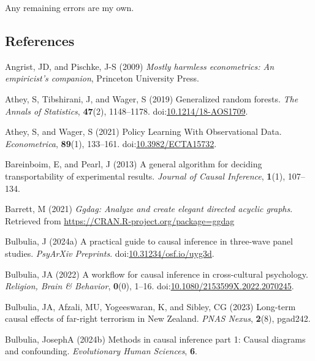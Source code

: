 \documentclass[
  single column]{article}
\newlength{\cslhangindent}
\newenvironment{CSLReferences}[2] %
 {\begin{list}{}{%
  \setlength{\itemindent}{0pt}
  \setlength{\leftmargin}{0pt}
  \setlength{\parsep}{0pt}
  \ifodd #1
   \setlength{\leftmargin}{\cslhangindent}
   \setlength{\itemindent}{-1\cslhangindent}
  \fi
  \setlength{\itemsep}{#2\baselineskip}}}
 {\end{list}}
\begin{document}
Any remaining errors are my own.

\newpage{}

\subsection{References}\label{references}

\label{refs}
\begin{CSLReferences}{1}{0}
Angrist, JD, and Pischke, J-S (2009) \emph{Mostly harmless econometrics:
An empiricist's companion}, Princeton University Press.

Athey, S, Tibshirani, J, and Wager, S (2019) Generalized random forests.
\emph{The Annals of Statistics}, \textbf{47}(2), 1148--1178.
doi:\href{https://doi.org/10.1214/18-AOS1709}{10.1214/18-AOS1709}.

Athey, S, and Wager, S (2021) Policy Learning With Observational Data.
\emph{Econometrica}, \textbf{89}(1), 133--161.
doi:\href{https://doi.org/10.3982/ECTA15732}{10.3982/ECTA15732}.

Bareinboim, E, and Pearl, J (2013) A general algorithm for deciding
transportability of experimental results. \emph{Journal of Causal
Inference}, \textbf{1}(1), 107--134.

Barrett, M (2021) \emph{Ggdag: Analyze and create elegant directed
acyclic graphs}. Retrieved from
\url{https://CRAN.R-project.org/package=ggdag}

Bulbulia, J (2024a) A practical guide to causal inference in three-wave
panel studies. \emph{PsyArXiv Preprints}.
doi:\href{https://doi.org/10.31234/osf.io/uyg3d}{10.31234/osf.io/uyg3d}.

Bulbulia, JA (2022) A workflow for causal inference in cross-cultural
psychology. \emph{Religion, Brain \& Behavior}, \textbf{0}(0), 1--16.
doi:\href{https://doi.org/10.1080/2153599X.2022.2070245}{10.1080/2153599X.2022.2070245}.

Bulbulia, JA, Afzali, MU, Yogeeswaran, K, and Sibley, CG (2023)
Long-term causal effects of far-right terrorism in {N}ew {Z}ealand.
\emph{PNAS Nexus}, \textbf{2}(8), pgad242.

Bulbulia, JosephA (2024b) Methods in causal inference part 1: Causal
diagrams and confounding. \emph{Evolutionary Human Sciences},
\textbf{6}.


\end{CSLReferences}
\end{document}
